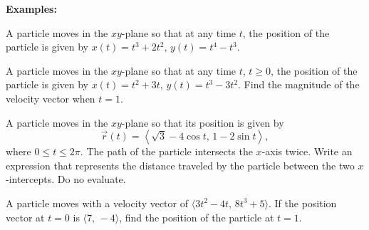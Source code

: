 \noindent\textbf{Examples:}
\begin{questions}
    \question A particle moves in the $xy$-plane so that at any time $t$, the position of the particle is given by $x(t)=t^3+2t^2,\,y(t)=t^4-t^3$.


    \newpage

    \question A particle moves in the $xy$-plane so that at any time $t$, $t\ge0$, the position of the particle is given by $x(t)=t^2+3t,\,y(t)=t^3-3t^2$. Find the magnitude of the velocity vector when $t=1$.
    

    \question A particle moves in the $xy$-plane so that its position is given by \[\displaystyle\vec{r}(t)=\left\langle\sqrt{3}-4\cos t,\,1-2\sin t\right\rangle,\]where $0\le t\le2\pi$. The path of the particle intersects the $x$-axis twice. Write an expression that represents the distance traveled by the particle between the two $x$-intercepts. Do no evaluate.
    
    
    \question A particle moves with a velocity vector of $\langle3t^2-4t,\,8t^3+5\rangle.$ If the position vector at $t=0$ is $\langle7,\,-4\rangle$, find the position of the particle at $t=1$.
    
    
\end{questions}


\newpage

